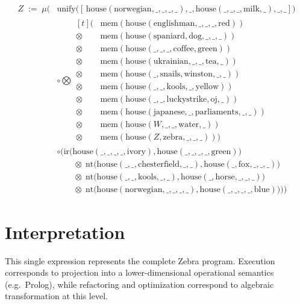 \documentclass[12pt,a4paper]{article}
\begin{document}
\[
\begin{aligned}
Z
\;:=\;
\mu\Bigg(
&
\mathrm{unify}\Big(
[\,\mathrm{house}(\mathrm{norwegian},\_,\_,\_,\_),
\_,
\mathrm{house}(\_,\_,\_,\mathrm{milk},\_),
\_,
\_]
\Big)
\\[4pt]
&\circ
\bigotimes
\begin{aligned}[t]
(&\mathrm{mem}(\mathrm{house}(\mathrm{englishman},\_,\_,\_,\mathrm{red})) \\
\otimes\;&\mathrm{mem}(\mathrm{house}(\mathrm{spaniard},\mathrm{dog},\_,\_,\_)) \\
\otimes\;&\mathrm{mem}(\mathrm{house}(\_,\_,\_,\mathrm{coffee},\mathrm{green})) \\
\otimes\;&\mathrm{mem}(\mathrm{house}(\mathrm{ukrainian},\_,\_,\mathrm{tea},\_)) \\
\otimes\;&\mathrm{mem}(\mathrm{house}(\_,\mathrm{snails},\mathrm{winston},\_,\_)) \\
\otimes\;&\mathrm{mem}(\mathrm{house}(\_,\_,\mathrm{kools},\_,\mathrm{yellow})) \\
\otimes\;&\mathrm{mem}(\mathrm{house}(\_,\_,\mathrm{luckystrike},\mathrm{oj},\_)) \\
\otimes\;&\mathrm{mem}(\mathrm{house}(\mathrm{japanese},\_,\mathrm{parliaments},\_,\_)) \\
\otimes\;&\mathrm{mem}(\mathrm{house}(W,\_,\_,\mathrm{water},\_)) \\
\otimes\;&\mathrm{mem}(\mathrm{house}(Z,\mathrm{zebra},\_,\_,\_))
)
\end{aligned}
\\[6pt]
&\circ
\Big(
\mathrm{ir}\big(
\mathrm{house}(\_,\_,\_,\_,\mathrm{ivory}),
\mathrm{house}(\_,\_,\_,\_,\mathrm{green})
\big)
\\
&\qquad\otimes\;
\mathrm{nt}\big(
\mathrm{house}(\_,\_,\mathrm{chesterfield},\_,\_),
\mathrm{house}(\_,\mathrm{fox},\_,\_,\_)
\big)
\\
&\qquad\otimes\;
\mathrm{nt}\big(
\mathrm{house}(\_,\_,\mathrm{kools},\_,\_),
\mathrm{house}(\_,\mathrm{horse},\_,\_,\_)
\big)
\\
&\qquad\otimes\;
\mathrm{nt}\big(
\mathrm{house}(\mathrm{norwegian},\_,\_,\_,\_),
\mathrm{house}(\_,\_,\_,\_,\mathrm{blue})
\big)
\Big)
\Bigg)
\end{aligned}
\]

\section*{Interpretation}

This single expression represents the complete Zebra program.
Execution corresponds to projection into a lower-dimensional operational
semantics (e.g.\ Prolog), while refactoring and optimization correspond
to algebraic transformation at this level.
\end{document}
